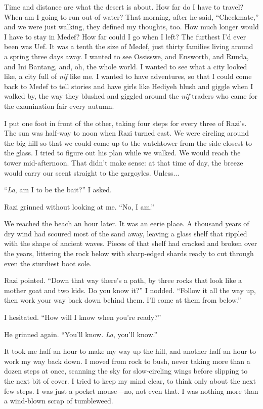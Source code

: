 Time and distance are what the desert is about.  How far do I have to
travel?  When am I going to run out of water?  That morning, after he
said, ``Checkmate,'' and we were just walking, they defined my thoughts,
too.  How much longer would I have to stay in Medef?  How far could I
go when I left?  The furthest I'd ever been was Uef.  It was a tenth
the size of Medef, just thirty families living around a spring three
days away.  I wanted to see Ossisswe, and Ensworth, and Ruuda, and Ini
Bantang, and, oh, the whole world.  I wanted to see what a city looked
like, a city full of \emph{nif} like me.  I wanted to have adventures, so
that I could come back to Medef to tell stories and have girls like
Hediyeh blush and giggle when I walked by, the way they blushed and
giggled around the \emph{nif} traders who came for the examination fair
every autumn.

I put one foot in front of the other, taking four steps for every
three of Razi's.  The sun was half-way to noon when Razi turned east.
We were circling around the big hill so that we could come up to the
watchtower from the side closest to the glass.  I tried to figure out
his plan while we walked.  We would reach the tower mid-afternoon.
That didn't make sense: at that time of day, the breeze would carry
our scent straight to the gargoyles.  Unless...

``\emph{La}, am I to be the bait?''  I asked.

Razi grinned without looking at me.  ``No, I am.''

We reached the beach an hour later.  It was an eerie place.  A
thousand years of dry wind had scoured most of the sand away, leaving
a glass shelf that rippled with the shape of ancient waves.  Pieces of
that shelf had cracked and broken over the years, littering the rock
below with sharp-edged shards ready to cut through even the sturdiest
boot sole.

Razi pointed.  ``Down that way there's a path, by three rocks that look
like a mother goat and two kids.  Do you know it?''  I nodded.  ``Follow
it all the way up, then work your way back down behind them.  I'll
come at them from below.''

I hesitated.  ``How will I know when you're ready?''

He grinned again.  ``You'll know.  \emph{La}, you'll know.''

It took me half an hour to make my way up the hill, and another half
an hour to work my way back down.  I moved from rock to bush, never
taking more than a dozen steps at once, scanning the sky for
slow-circling wings before slipping to the next bit of cover.  I tried
to keep my mind clear, to think only about the next few steps.  I was
just a pocket mouse---no, not even that.  I was nothing more than a
wind-blown scrap of tumbleweed.

